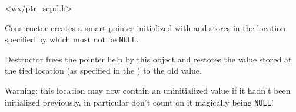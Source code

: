 



<wx/ptr\_scpd.h>


\label{wxscopedtiedptrctor}


Constructor creates a smart pointer initialized with  and stores 
 in the location specified by  which must not be 
{\tt NULL}.

\label{wxscopedtiedptrdtor}


Destructor frees the pointer help by this object and restores the value stored
at the tied location (as specified in the )
to the old value.

Warning: this location may now contain an uninitialized value if it hadn't been
initialized previously, in particular don't count on it magically being 
{\tt NULL}!


